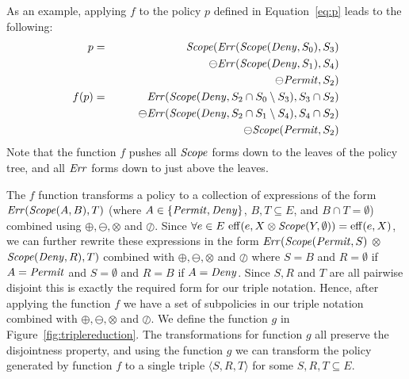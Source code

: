 As an example, applying $f$ to the policy $p$ defined in
Equation~\eqref{eq:p} leads to the following:
\begin{eqnarray*}
  p & = & \text{\textit{Scope}} (\text{\textit{Err}} (\text{\textit{Scope}} (\text{\textit{Deny}}, S_0), S_3) \\
  & & \qquad \ominus \text{\textit{Err}} (\text{\textit{Scope}} (\text{\textit{Deny}}, S_1), S_4) \\
  & & \qquad \ominus \text{\textit{Permit}}, S_2) \nonumber \\
  f(p)  & = & \text{\textit{Err}} (\text{\textit{Scope}} (\text{\textit{Deny}}, S_2 \cap S_0 \setminus S_3), S_3 \cap S_2) \\
  & & \qquad \ominus
  \text{\textit{Err}} (\text{\textit{Scope}} (\text{\textit{Deny}}, S_2 \cap S_1 \setminus S_4), S_4 \cap S_2) \\
  & & \qquad \ominus \text{\textit{Scope}} (\text{\textit{Permit}}, S_2)
\end{eqnarray*}
Note that the function $f$ pushes all $\text{\textit{Scope}}$ forms down to the leaves
of the policy tree, and all $\text{\textit{Err}}$ forms down to just above the leaves.

The $f$ function transforms a policy to a collection of expressions of
the form $\text{\textit{Err}} (\text{\textit{Scope}} (A, B), T)$ (where $A \in \{ \text{\textit{Permit}}, \text{\textit{Deny}}
\}$, $B, T \subseteq E$, and $B \cap T = \emptyset$) combined using
$\oplus, \ominus, \otimes$ and $\oslash$.  Since $\forall e \in E \,
\operatorname{eff} (e, X \otimes \text{\textit{Scope}} (Y, \emptyset)) = \operatorname{eff} (e, X)$, we can
further rewrite these expressions in the form $\text{\textit{Err}} (\text{\textit{Scope}} (\text{\textit{Permit}},
S)$ $\otimes$ $\text{\textit{Scope}} (\text{\textit{Deny}}, R), T)$ combined with $\oplus, \ominus,
\otimes$ and $\oslash$ where $S = B$ and $R = \emptyset$ if $A =
\text{\textit{Permit}}$ and $S = \emptyset$ and $R = B$ if $A = \text{\textit{Deny}}$.  Since $S, R$
and $T$ are all pairwise disjoint this is exactly the required form
for our triple notation.  Hence, after applying the function $f$ we
have a set of subpolicies in our triple notation combined with
$\oplus, \ominus, \otimes$ and $\oslash$.  We define the function $g$
in Figure~\ref{fig:triplereduction}.  The transformations for function
$g$ all preserve the disjointness property, and using the function $g$
we can transform the policy generated by function $f$ to a single
triple $\langle S, R, T \rangle$ for some $S, R, T \subseteq E$.

